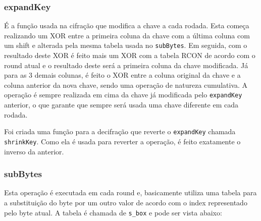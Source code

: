 \documentclass[12pt]{article}
\begin{document}
\subsubsection{expandKey}
É a função usada na cifração que modifica a chave a cada rodada. Esta começa realizando um XOR entre a primeira coluna da chave com a última coluna com um shift e alterada pela mesma tabela usada no \texttt{subBytes}. Em seguida, com o resultado deste XOR é feito mais um XOR com a tabela RCON de acordo com o round atual e o resultado deste será a primeira coluna da chave modificada. Já para as 3 demais colunas, é feito o XOR entre a coluna original da chave e a coluna anterior da nova chave, sendo uma operação de natureza cumulativa. A operação é sempre realizada em cima da chave já modificada pelo \texttt{expandKey} anterior, o que garante que sempre será usada uma chave diferente em cada rodada.

Foi criada uma função para a decifração que reverte o \texttt{expandKey} chamada \texttt{shrinkKey}. Como ela é usada para reverter a operação, é feito exatamente o inverso da anterior.

\subsubsection{subBytes}
Esta operação é executada em cada round e, basicamente utiliza uma tabela para a substituição do byte por um outro valor de acordo com o index representado pelo byte atual. A tabela é chamada de \texttt{s\_box} e pode ser vista abaixo:
\end{document}
